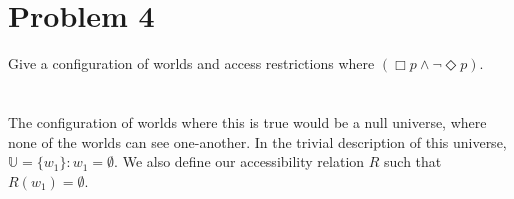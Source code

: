 \documentclass{article}%
\begin{document}
\section*{Problem 4}
Give a configuration of worlds and access restrictions where $(\Box p \wedge \neg \Diamond p)$. \\
\\
\vspace{0.1in}\\
\noindent
The configuration of worlds where this is true would be a null universe, where none of the worlds can see
one-another. In the trivial description of this universe, $\mathbb{U} = \{w_1\} : w_1 = \emptyset$. We also
define our accessibility relation $R$ such that $R(w_1) = \emptyset$.
\end{document}
